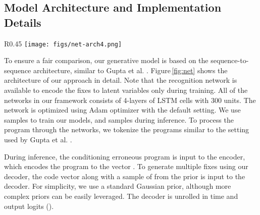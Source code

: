 \documentclass[runningheads]{llncs}
\newcommand{\figref}{Figure}
\begin{document}
\subsection{Model Architecture and Implementation Details}
	
\begin{wrapfigure}[11]{R}{0.45\linewidth}
\vspace{-.8cm}
\centering
    \texttt{[image: figs/net-arch4.png]}
    \caption{Overview of network architecture.}
\label{fig:net}
\end{wrapfigure}

To ensure a fair comparison, our generative model is based on the sequence-to-sequence architecture, similar to Gupta et al. \cite{Gupta2017DeepFixFC}. \figref \,\ref{fig:net} shows the architecture of our approach in detail. Note that the recognition network is available to encode the fixes to latent variables  only during training.
All of the networks in our framework consists of 4-layers of LSTM cells with 300 units. The network is optimized using Adam optimizer \cite{kingma15adam} with the default setting.
We use  samples to train our models, and  samples during inference. To process the program through the networks, we tokenize the programs similar to the setting used by Gupta et al. \cite{Gupta2017DeepFixFC}.

During inference, the conditioning erroneous program  is input to the encoder, which encodes the program to the vector . To generate multiple fixes using our decoder, the code vector  along with a sample of  from the prior  is input to the decoder. For simplicity, we use a standard Gaussian   prior, although more complex priors can be easily leveraged. The decoder is unrolled in time and output logits (). 
\end{document}
